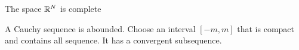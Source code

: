 \begin{theorem}
    The space $\mathbb{R}^N$ is complete
\end{theorem}
\begin{theorem}
    A Cauchy sequence is abounded. Choose an interval $[-m, m]$ that is compact and contains all sequence. It has a convergent subsequence.
\end{theorem}








































































































